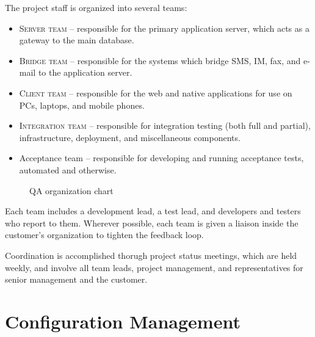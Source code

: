 \documentclass[11pt]{wacomepd}
\begin{document}
The project staff is organized into several teams:

\begin{itemize}
\item \textsc{Server team} -- responsible for the primary application server, which acts as a
  gateway to the main database.
\item \textsc{Bridge team} -- responsible for the systems which bridge SMS, IM, fax, and e-mail to
  the application server.
\item \textsc{Client team} -- responsible for the web and native applications for use on PCs,
  laptops, and mobile phones.
\item \textsc{Integration team} -- responsible for integration testing (both full and partial),
  infrastructure, deployment, and miscellaneous components.
\item {\sc Acceptance team} -- responsible for developing and running acceptance tests, automated
  and otherwise.
\end{itemize}

\begin{figure}[h]
  \caption{QA organization chart}
\end{figure}

Each team includes a development lead, a test lead, and developers and testers who report to them.
Wherever possible, each team is given a liaison inside the customer's organization to tighten
the feedback loop.

Coordination is accomplished thorugh project status meetings, which are held weekly, and involve all
team leads, project management, and representatives for senior management and the customer.


\chapter{Configuration Management}
\end{document}
